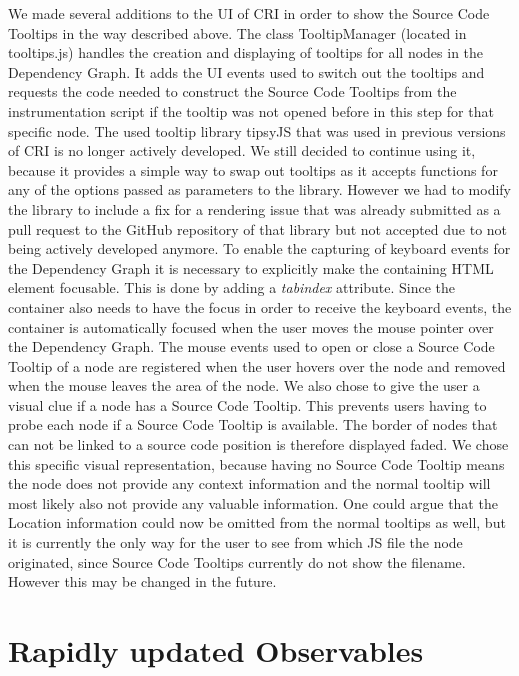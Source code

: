 We made several additions to the UI of CRI in order to show the Source Code Tooltips in the way described above. The class TooltipManager (located in tooltips.js) handles the creation and displaying of tooltips for all nodes in the Dependency Graph. It adds the UI events used to switch out the tooltips and requests the code needed to construct the Source Code Tooltips from the instrumentation script if the tooltip was not opened before in this step for that specific node. The used tooltip library tipsyJS \cite{Tipsy} that was used in previous versions of CRI is no longer actively developed. We still decided to continue using it, because it provides a simple way to swap out tooltips as it accepts functions for any of the options passed as parameters to the library. However we had to modify the library to include a fix for a rendering issue that was already submitted as a pull request to the GitHub repository of that library but not accepted due to not being actively developed anymore. To enable the capturing of keyboard events for the Dependency Graph it is necessary to explicitly make the containing HTML element focusable. This is done by adding a \emph{tabindex} attribute. Since the container also needs to have the focus in order to receive the keyboard events, the container is automatically focused when the user moves the mouse pointer over the Dependency Graph. The mouse events used to open or close a Source Code Tooltip of a node are registered when the user hovers over the node and removed when the mouse leaves the area of the node. We also chose to give the user a visual clue if a node has a Source Code Tooltip. This prevents users having to probe each node if a Source Code Tooltip is available. The border of nodes that can not be linked to a source code position is therefore displayed faded. We chose this specific visual representation, because having no Source Code Tooltip means the node does not provide any context information and the normal tooltip will most likely also not provide any valuable information. One could argue that the Location information could now be omitted from the normal tooltips as well, but it is currently the only way for the user to see from which JS file the node originated, since Source Code Tooltips currently do not show the filename. However this may be changed in the future.
	
\section{Rapidly updated Observables}
\label{sec:RapidlyUpdatedObservables}
	
